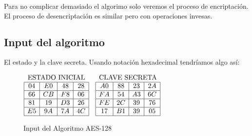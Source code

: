 Para no complicar demasiado el algorimo solo veremos el proceso de encriptación. El proceso de desencriptación es similar pero con operaciones invesas.
\subsection{Input del algoritmo}

El estado y la clave secreta. Usando notación hexadecimal tendríamos algo así:
\begin{figure}[!ht]
\begin{figurebox}
\begin{center}
$\begin{array}{|c|c|c|c|}
\multicolumn{4}{c}{\text{ESTADO INICIAL}}\\\hline
04 & E0 & 48 & 28\\\hline
66 & CB & F8 & 06\\\hline
81 & 19 & D3 & 26\\\hline
E5 & 9A & 7A & 4C\\\hline
\end{array}
\quad
\begin{array}{|c|c|c|c|}
\multicolumn{4}{c}{\text{CLAVE SECRETA}}\\\hline
A0 & 88 & 23 & 2A\\\hline
FA & 54 & A3 & 6C\\\hline
FE & 2C & 39 & 76\\\hline
17 & B1 & 39 & 05\\\hline
\end{array}
$
\end{center}\caption{Input del Algoritmo AES-128}\label{fig:inputaes1}
\end{figurebox}
\end{figure}


